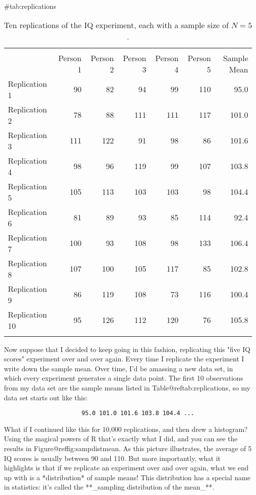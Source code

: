 \begin{table}[t]
\centering
\caption{Ten replications of the IQ experiment, each with a sample size of $N=5$.}
{#tab:replications}
\begin{tabular}{l|rrrrr|r}
 \multicolumn{6}{c}{} \\
 & Person 1 & Person 2 & Person 3 & Person 4 & Person 5 & Sample Mean \\ 
  \hline
Replication 1 & 90 & 82 & 94 & 99 & 110 & 95.0 \\ 
  Replication 2 & 78 & 88 & 111 & 111 & 117 & 101.0 \\ 
  Replication 3 & 111 & 122 & 91 & 98 & 86 & 101.6 \\ 
  Replication 4 & 98 & 96 & 119 & 99 & 107 & 103.8 \\ 
  Replication 5 & 105 & 113 & 103 & 103 & 98 & 104.4 \\ 
  Replication 6 & 81 & 89 & 93 & 85 & 114 & 92.4 \\ 
  Replication 7 & 100 & 93 & 108 & 98 & 133 & 106.4 \\ 
  Replication 8 & 107 & 100 & 105 & 117 & 85 & 102.8 \\ 
  Replication 9 & 86 & 119 & 108 & 73 & 116 & 100.4 \\ 
  Replication 10 & 95 & 126 & 112 & 120 & 76 & 105.8 \\ 
  \multicolumn{6}{c}{} \\
\end{tabular}
\HR
\end{table}

Now suppose that I decided to keep going in this fashion, replicating this "five IQ scores" experiment over and over again. Every time I replicate the experiment I write down the sample mean. Over time, I'd be amassing a new data set, in which every experiment generates a single data point. The first 10 observations from my data set are the sample means listed in Table@reftab:replications, so my data set starts out like this:
\begin{verbatim}
                      95.0 101.0 101.6 103.8 104.4 ...
\end{verbatim}
What if I continued like this for 10,000 replications, and then drew a histogram? Using the magical powers of R that's exactly what I did, and you can see the results in Figure@reffig:sampdistmean. As this picture illustrates, the average of 5 IQ scores is usually between 90 and 110. But more importantly, what it highlights is that if we replicate an experiment over and over again, what we end up with is a *distribution* of sample means! This distribution has a special name in statistics: it's called the **_sampling distribution of the mean_**. 


